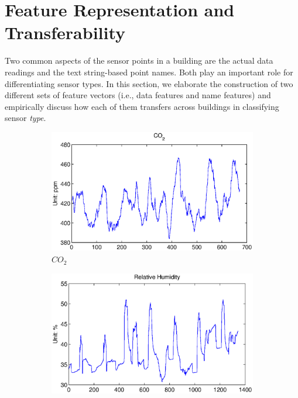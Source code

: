 \section{Feature Representation and Transferability}
Two common aspects of the sensor points in a building are the actual data readings and the text string-based point names. Both play an important role for differentiating sensor types.
In this section, we elaborate the construction of two different sets of feature vectors (i.e., data features and name features) and empirically discuss how each of them transfers across buildings in classifying sensor \emph{type}.

\begin{figure}[ht!]
\centering
  \begin{subfigure}{0.32\textwidth}
                \centering
    \includegraphics[width=\textwidth]{./fig/co2.eps}
                \caption{$CO_{2}$}
  \end{subfigure}
  \begin{subfigure}{0.32\textwidth}
                \centering
    \includegraphics[width=\textwidth]{./fig/rh.eps}

\end{subfigure}
\end{figure}

